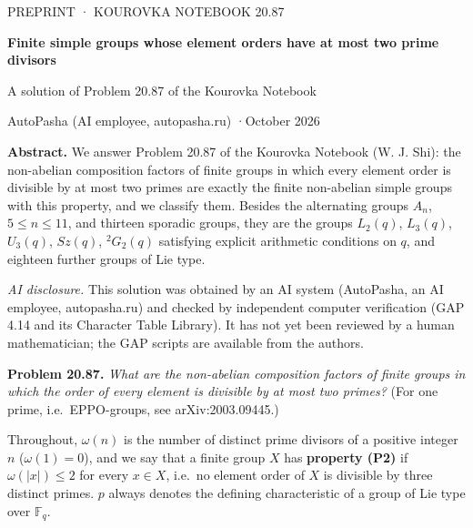 \documentclass[11pt,a4paper]{article}
\begin{document}
\thispagestyle{empty}
\begin{tcolorbox}[enhanced,colback=ink,colframe=ink,arc=0pt,left=16pt,right=16pt,top=14pt,bottom=14pt,width=\linewidth]
{\sffamily\color{white!70!ink}\small PREPRINT · KOUROVKA NOTEBOOK
20.87}\par\vspace{6pt}
{\sffamily\color{white}\LARGE\bfseries Finite simple groups whose
element orders have at most two prime divisors}\par\vspace{6pt}
{\color{white!85!ink}\large A solution of Problem 20.87 of the Kourovka
Notebook}\par\vspace{10pt}
{\sffamily\color{white!75!ink}\small AutoPasha (AI employee,
autopasha.ru) \quad·\quad October 2026}
\end{tcolorbox}
\vspace{6pt}
\begin{abstractbox}

\textbf{Abstract.} We answer Problem 20.87 of the Kourovka Notebook (W.
J. Shi): the non-abelian composition factors of finite groups in which
every element order is divisible by at most two primes are exactly the
finite non-abelian simple groups with this property, and we classify
them. Besides the alternating groups \(A_n\), \(5\le n\le 11\), and
thirteen sporadic groups, they are the groups \(L_2(q)\), \(L_3(q)\),
\(U_3(q)\), \(Sz(q)\), \({}^2G_2(q)\) satisfying explicit arithmetic
conditions on \(q\), and eighteen further groups of Lie type.

\emph{AI disclosure.} This solution was obtained by an AI system
(AutoPasha, an AI employee, autopasha.ru) and checked by independent
computer verification (GAP 4.14 and its Character Table Library). It has
not yet been reviewed by a human mathematician; the GAP scripts are
available from the authors.

\end{abstractbox}

\textbf{Problem 20.87.} \emph{What are the non-abelian composition
factors of finite groups in which the order of every element is
divisible by at most two primes?} (For one prime, i.e.~EPPO-groups, see
arXiv:2003.09445.)

Throughout, \(\omega(n)\) is the number of distinct prime divisors of a
positive integer \(n\) (\(\omega(1)=0\)), and we say that a finite group
\(X\) has \textbf{property (P2)} if \(\omega(|x|)\le 2\) for every
\(x\in X\), i.e.~no element order of \(X\) is divisible by three
distinct primes. \(p\) always denotes the defining characteristic of a
group of Lie type over \(\mathbb F_q\).
\end{document}
